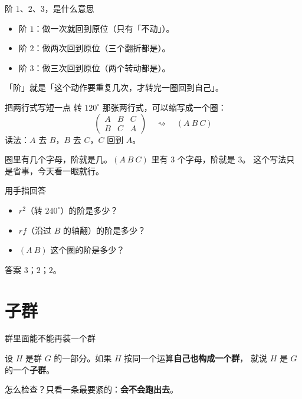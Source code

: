 \documentclass[10pt]{beamer}
\begin{document}
\begin{frame}{阶 \(1\)、\(2\)、\(3\)，是什么意思}
  \begin{itemize}
    \item 阶 \(1\)：做一次就回到原位（只有「不动」）。
    \item 阶 \(2\)：做两次回到原位（三个翻折都是）。
    \item 阶 \(3\)：做三次回到原位（两个转动都是）。
  \end{itemize}
  \pause
  \begin{att}
    「阶」就是「这个动作要重复几次，才转完一圈回到自己」。
  \end{att}
\end{frame}

\begin{frame}{把两行式写短一点}
  转 \(120^\circ\) 那张两行式，可以缩写成一个圈：
  \[
    \begin{pmatrix}A&B&C\\B&C&A\end{pmatrix}
    \quad\rightsquigarrow\quad
    (A\ B\ C)
  \]
  \pause
  读法：\(A\) 去 \(B\)，\(B\) 去 \(C\)，\(C\) 回到 \(A\)。
  \pause
  \begin{att}
    圈里有几个字母，阶就是几。\((A\ B\ C)\) 里有 \(3\) 个字母，阶就是 \(3\)。
    这个写法只是省事，今天看一眼就行。
  \end{att}
\end{frame}

\begin{frame}{用手指回答}
  \begin{itemize}
    \item \(r^2\)（转 \(240^\circ\)）的阶是多少？
    \item \(rf\)（沿过 \(B\) 的轴翻）的阶是多少？
    \item \((A\ B)\) 这个圈的阶是多少？
  \end{itemize}
  \pause
  \begin{block}{答案}
    \(3\)；\quad \(2\)；\quad \(2\)。
  \end{block}
\end{frame}

\section{子群}

\begin{frame}{群里面能不能再装一个群}
  \begin{definition}[子群]
    设 \(H\) 是群 \(G\) 的一部分。如果 \(H\) 按同一个运算\textbf{自己也构成一个群}，
    就说 \(H\) 是 \(G\) 的一个\textbf{子群}。
  \end{definition}
  \pause
  \begin{center}
    怎么检查？只看一条最要紧的：\textbf{会不会跑出去}。
  \end{center}
\end{frame}
\end{document}

